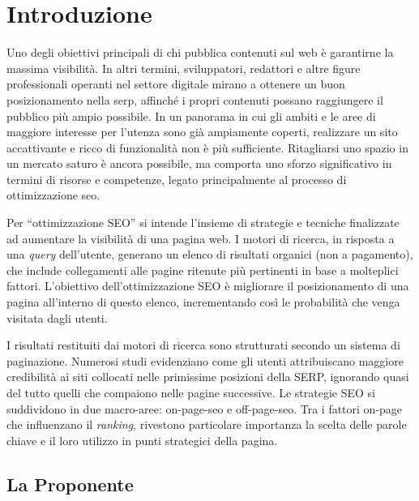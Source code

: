 \chapter{Introduzione}
\label{cap:introduzione}

\par Uno degli obiettivi principali di chi pubblica contenuti sul web è garantirne la massima visibilità. In altri termini, sviluppatori, redattori e altre figure professionali operanti nel settore digitale mirano a ottenere un buon posizionamento nella \gls{serp}, affinché i propri contenuti possano raggiungere il pubblico più ampio possibile. In un panorama in cui gli ambiti e le aree di maggiore interesse per l’utenza sono già ampiamente coperti, realizzare un sito accattivante e ricco di funzionalità non è più sufficiente. Ritagliarsi uno spazio in un mercato saturo è ancora possibile, ma comporta uno sforzo significativo in termini di risorse e competenze, legato principalmente al processo di ottimizzazione \gls{seo}.

\vspace{10pt}
\par\noindent Per “ottimizzazione SEO” si intende l’insieme di strategie e tecniche finalizzate ad aumentare la visibilità di una pagina web. I motori di ricerca, in risposta a una \textit{query} dell’utente, generano un elenco di risultati organici (non a pagamento), che include collegamenti alle pagine ritenute più pertinenti in base a molteplici fattori. L’obiettivo dell’ottimizzazione SEO è migliorare il posizionamento di una pagina all’interno di questo elenco, incrementando così le probabilità che venga visitata dagli utenti.

\vspace{10pt}
\par\noindent I risultati restituiti dai motori di ricerca sono strutturati secondo un sistema di paginazione. Numerosi studi evidenziano come gli utenti attribuiscano maggiore credibilità ai siti collocati nelle primissime posizioni della SERP, ignorando quasi del tutto quelli che compaiono nelle pagine successive. Le strategie SEO si suddividono in due macro-aree: \gls{on-page-seo} e \gls{off-page-seo}. Tra i fattori on-page che influenzano il \textit{ranking}, rivestono particolare importanza la scelta delle parole chiave e il loro utilizzo in punti strategici della pagina.

\section{La Proponente}

